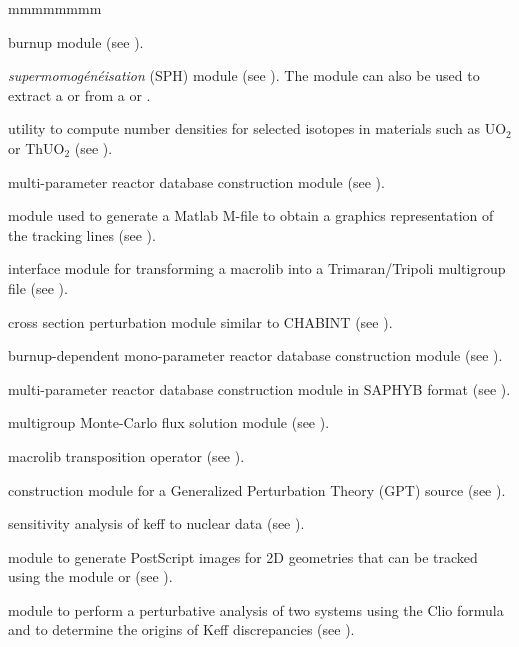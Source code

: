 \begin{ListeDeDescription}{mmmmmmmm}
\item[\moc{EVO:}] burnup module (see ).

\item[\moc{SPH:}] {\sl supermomog\'en\'eisation} (SPH) module (see ). The 
module can also be used to extract a  or  from a  or .

\item[\moc{INFO:}] utility to compute number densities for selected isotopes in materials such as
UO$_{2}$ or ThUO$_{2}$ (see ).

\item[\moc{COMPO:}] multi-parameter reactor database construction module (see
).

\item[\moc{TLM:}] module used to generate a Matlab M-file to obtain a graphics representation of the  
tracking lines (see ).

\item[\moc{M2T:}] interface module for transforming a macrolib into a Trimaran/Tripoli multigroup file (see ).

\item[\moc{CHAB:}] cross section perturbation module similar to CHABINT (see ).

\item[\moc{CPO:}] burnup-dependent mono-parameter reactor database construction module (see
).

\item[\moc{SAP:}] multi-parameter reactor database construction module in SAPHYB format (see
).

\item[\moc{MC:}] multigroup Monte-Carlo flux solution module (see ).

\item[\moc{T:}] macrolib transposition operator (see ).

\item[\moc{DMAC:}] construction module for a Generalized Perturbation Theory (GPT) source (see ).

\item[\moc{SENS:}] sensitivity analysis of keff to nuclear data (see ).

\item[\moc{PSP:}] module to generate PostScript images for 2D geometries that can be tracked using the module 
 or  (see ).

\item[\moc{DUO:}] module to perform a perturbative analysis of two systems using the Clio formula and to determine the origins
of Keff discrepancies (see ).

\end{ListeDeDescription}
